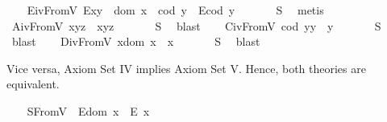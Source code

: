 \begin{isabellebody}
{\isafoldproof}%
%
\isadelimproof
\isanewline
%
\endisadelimproof
\ \ \isamarkupfalse%
\ E\isactrlsub i\isactrlsub vFromV{\isacharcolon}\ {\isachardoublequoteopen}E{\isacharparenleft}x{\isasymcdot}y{\isacharparenright}\ \isactrlbold {\isasymleftrightarrow}\ {\isacharparenleft}dom\ x\ {\isasymcong}\ cod\ y\ \isactrlbold {\isasymand}\ E{\isacharparenleft}cod\ y{\isacharparenright}{\isacharparenright}{\isachardoublequoteclose}\ \isanewline
%
\isadelimproof
\ \ \ \ %
\endisadelimproof
%
\isatagproof
{}\isamarkupfalse%
\ S{}\ \isamarkupfalse%
\ metis%
\endisatagproof
{\isafoldproof}%
%
\isadelimproof
\isanewline
%
\endisadelimproof
\ \ \isamarkupfalse%
\ A\isactrlsub i\isactrlsub vFromV{\isacharcolon}\ {\isachardoublequoteopen}x{\isasymcdot}{\isacharparenleft}y{\isasymcdot}z{\isacharparenright}\ {\isasymcong}\ {\isacharparenleft}x{\isasymcdot}y{\isacharparenright}{\isasymcdot}z{\isachardoublequoteclose}\ \isanewline
%
\isadelimproof
\ \ \ \ %
\endisadelimproof
%
\isatagproof
{}\isamarkupfalse%
\ S{}\ \isamarkupfalse%
\ blast%
\endisatagproof
{\isafoldproof}%
%
\isadelimproof
\isanewline
%
\endisadelimproof
\ \ \isamarkupfalse%
\ C\isactrlsub i\isactrlsub vFromV{\isacharcolon}\ {\isachardoublequoteopen}{\isacharparenleft}cod\ y{\isacharparenright}{\isasymcdot}y\ {\isasymcong}\ y{\isachardoublequoteclose}\ \isanewline
%
\isadelimproof
\ \ \ \ %
\endisadelimproof
%
\isatagproof
{}\isamarkupfalse%
\ S{}\ \isamarkupfalse%
\ blast%
\endisatagproof
{\isafoldproof}%
%
\isadelimproof
\isanewline
%
\endisadelimproof
\ \ \isamarkupfalse%
\ D\isactrlsub i\isactrlsub vFromV{\isacharcolon}\ {\isachardoublequoteopen}x{\isasymcdot}{\isacharparenleft}dom\ x{\isacharparenright}\ {\isasymcong}\ x{\isachardoublequoteclose}\ \isanewline
%
\isadelimproof
\ \ \ \ %
\endisadelimproof
%
\isatagproof
{}\isamarkupfalse%
\ S{}\ \isamarkupfalse%
\ blast%
\endisatagproof
{\isafoldproof}%
%
\isadelimproof
%
\endisadelimproof
%
\begin{isamarkuptext}%
Vice versa, Axiom Set IV implies Axiom Set V. Hence, both theories are
 equivalent.%
\end{isamarkuptext}\isamarkuptrue%
\ \ \isamarkupfalse%
\ S{}FromV{\isacharcolon}\ \ {\isachardoublequoteopen}E{\isacharparenleft}dom\ x{\isacharparenright}\ \isactrlbold {\isasymrightarrow}\ E\ x{\isachardoublequoteclose}\ \isanewline

\end{isabellebody}
